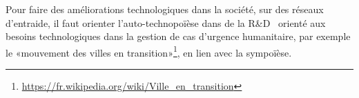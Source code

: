 
Pour faire des améliorations technologiques dans la société, sur des réseaux d'entraide, il faut orienter l'auto-technopoïèse dans de la R\&D~\cite{innovation_complex_social_system_2010} orienté aux besoins technologiques dans la gestion de cas d'urgence humanitaire, par exemple le «mouvement des villes en transition»\footnote{\url{https://fr.wikipedia.org/wiki/Ville_en_transition}}, en lien avec la sympoïèse.


